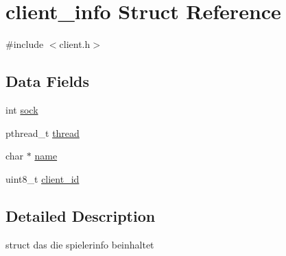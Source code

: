\hypertarget{structclient__info}{
\section{client\_\-info Struct Reference}
\label{structclient__info}
}


{\ttfamily \#include $<$client.h$>$}

\subsection*{Data Fields}
\begin{DoxyCompactItemize}
\item 
int \hyperlink{structclient__info_a5903d0b282fc5eae503de618f896b5e1}{sock}
\item 
pthread\_\-t \hyperlink{structclient__info_a01f75a9ad916f63a94e06a27635ba278}{thread}
\item 
char $\ast$ \hyperlink{structclient__info_a5ac083a645d964373f022d03df4849c8}{name}
\item 
uint8\_\-t \hyperlink{structclient__info_af230372c601d9c597265265e9f83f017}{client\_\-id}
\end{DoxyCompactItemize}


\subsection{Detailed Description}
struct das die spielerinfo beinhaltet 

